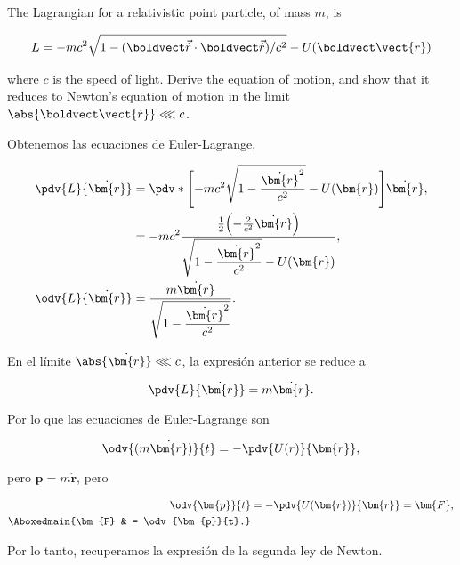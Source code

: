 \documentclass[../main.tex]{subfiles}
\begin{document}
\begin{problema}
	The Lagrangian for a relativistic point particle, of mass \(m\), is

	\begin{equation*}
		L = -mc^{2}\sqrt{1 - (\boldvect\vec{\dot{r}}\cdot \boldvect\vec{\dot{r}})/c^{2}} - U(\boldvect\vect{r})
	\end{equation*}

	where \(c\) is the speed of light. Derive the equation of motion, and
	show that it reduces to Newton's equation of motion in the limit
	\( \abs{\boldvect\vect{\dot{r}}} \lll c\).
\end{problema}

\startsolution

Obtenemos las ecuaciones de Euler-Lagrange,

\begin{align*}
	\pdv{L}{\dot{\bm{r}}} & = \pdv*{\Biggl[-mc^{2}\sqrt{1 - \dfrac{\dot{\bm{r}}^{2}}{c^{2}}} - U(\bm{r})\Biggr]}{\dot{\bm{r}}},\nonumber                             \\
	                      & = -mc^{2}\dfrac{\tfrac{1}{2}\Bigl(-\tfrac{2}{c^{2}}\dot{\bm{r}}\Bigr)}{\sqrt{1 - \dfrac{\dot{\bm{r}}^{2}}{c^{2}}} - U(\bm{r})},\nonumber \\
	\odv{L}{\dot{\bm{r}}} & = \dfrac{m \dot{\bm{r}}}{\sqrt{1 - \dfrac{\dot{\bm{r}}^{2}}{c^{2}}}}.
\end{align*}

En el límite \(\abs{\dot{\bm{r}}} \lll c\), la expresión anterior se reduce a

\begin{equation*}
	\pdv{L}{\dot{\bm{r}}} = m \dot{\bm{r}}.
\end{equation*}

Por lo que las ecuaciones de Euler-Lagrange son

\begin{equation*}
	\odv{(m \dot{\bm{r}})}{t} = -\pdv{U(r)}{\bm{r}},
\end{equation*}

pero \(\bm{p} = m \dot{\bm{r}}\), pero

\begin{align*}
	\odv{\bm{p}}{t}    & = -\pdv{U(\bm{r})}{\bm{r}} = \bm{F}, \\
	\Aboxedmain{\bm{F} & = \odv{\bm{p}}{t}.}
\end{align*}

Por lo tanto, recuperamos la expresión de la segunda ley de Newton.
\end{document}
